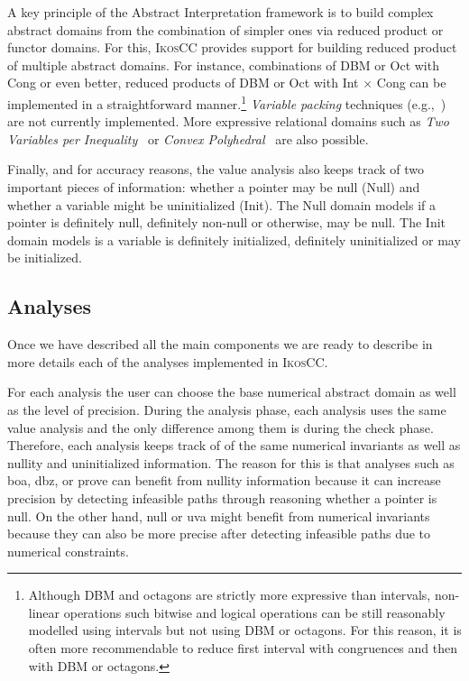 \documentclass[a4]{article}
\newcommand{\ikoscc}{\textsc{IkosCC}\xspace}
\begin{document}
A key principle of the Abstract Interpretation framework is to build
complex abstract domains from the combination of simpler ones via
reduced product or functor domains. For this, \ikoscc provides support
for building reduced product of multiple abstract domains. For
instance, combinations of DBM or Oct with Cong or even better, reduced
products of DBM or Oct with Int $\times$ Cong can be implemented in a
straightforward manner.\footnote{Although DBM and octagons are
  strictly more expressive than intervals, non-linear operations such
  bitwise and logical operations can be still reasonably modelled
  using intervals but not using DBM or octagons. For this reason, it
  is often more recommendable to reduce first interval with
  congruences and then with DBM or octagons.}  \emph{Variable packing}
techniques (e.g.,~\cite{VenetB04,octagons,Bouaziz12}) are not
currently implemented.
%
More expressive relational domains such as \emph{Two Variables per
  Inequality}~\cite{SimonK10} or \emph{Convex
  Polyhedral}~\cite{Cousot_Halbwachs_POPL78} are also possible.

Finally, and for accuracy reasons, the value analysis also keeps track
of two important pieces of information: whether a pointer may be null
(Null) and whether a variable might be uninitialized (Init). The Null
domain models if a pointer is definitely null, definitely non-null or
otherwise, may be null. The Init domain models is a variable is
definitely initialized, definitely uninitialized or may be
initialized.

\subsection{Analyses}
 

Once we have described all the main components we are ready to
describe in more details each of the analyses implemented in \ikoscc.

For each analysis the user can choose the base numerical abstract
domain as well as the level of precision. %
%
During the analysis phase, each analysis uses the same value analysis
and the only difference among them is during the check
phase. Therefore, each analysis keeps track of of the same numerical
invariants as well as nullity and uninitialized information. The
reason for this is that analyses such as \textsf{boa}, \textsf{dbz},
or \textsf{prove} can benefit from nullity information because it can
increase precision by detecting infeasible paths through reasoning
whether a pointer is null. On the other hand, \textsf{null} or
\textsf{uva} might benefit from numerical invariants because they can
also be more precise after detecting infeasible paths due to numerical
constraints.
\end{document}
